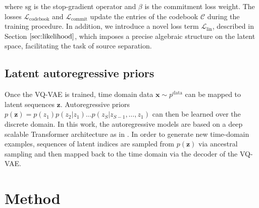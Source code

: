 \documentclass[a4paper]{article}
\begin{document}
where $\text{sg}$ is the stop-gradient operator and $\beta$ is the commitment loss weight. The losses $\mathcal{L}_{\text{codebook}}$ and $\mathcal{L}_{\text{commit}}$ update the entries of the codebook $\mathcal{C}$ during the training procedure. In addition, we introduce a novel loss term $\mathcal{L}_{\text{lin}}$, described in Section $\ref{sec:likelihood}$, which imposes a precise algebraic structure on the latent space, facilitating the task of source separation.

\subsection{Latent autoregressive priors}
Once the VQ-VAE is trained, time domain data $\mathbf{x} \sim p^{\text{data}}$ can be mapped to latent sequences $\mathbf{z}$. Autoregressive priors $p(\mathbf{z})=p(z_1)p(z_2|z_1) \dots p(z_S|z_{S-1},\dots, z_1)$ can then be learned over the discrete domain.
In this work, the autoregressive models are based on a deep scalable Transformer architecture as in \cite{dhariwal:2020}.
In order to generate new time-domain examples, sequences of latent indices are sampled from $p(\mathbf{z})$ via ancestral sampling and then mapped back to the time domain via the decoder of the VQ-VAE.  \section{Method}
\label{sec:method}
\end{document}
